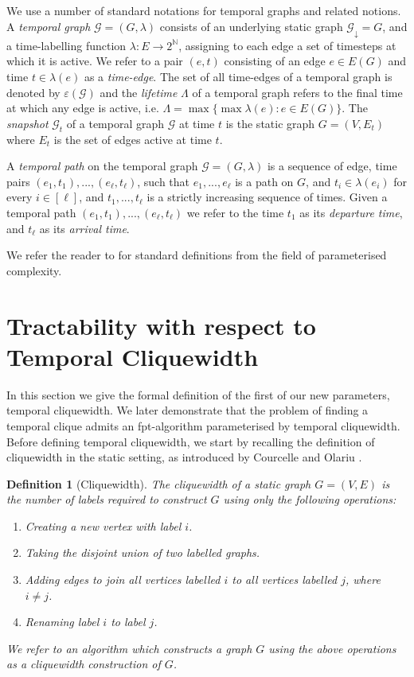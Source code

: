 \documentclass[preprint,12pt]{elsarticle}
\newtheorem{definition}{Definition}
\begin{document}
We use a number of standard notations for temporal graphs and related notions.  A \emph{temporal graph} $\mathcal{G} = (G, \lambda)$ consists of an underlying static graph $\mathcal{G}_\downarrow=G$, and a time-labelling function $\lambda : E \to 2^\mathbb{N}$, assigning to each edge a set of timesteps at which it is active. We refer to a pair $(e,t)$ consisting of an edge $e\in E(G)$ and time $t\in\lambda(e)$ as a \emph{time-edge}. The set of all time-edges of a temporal graph is denoted by $\varepsilon(\mathcal{G})$ and the \emph{lifetime} $\Lambda$ of a temporal graph refers to the final time at which any edge is active, i.e.  $\Lambda = \max \{ \max \lambda(e) : e \in  E(G)\}$. The \emph{snapshot} $\mathcal{G}_t$ of a temporal graph $\mathcal{G}$ at time $t$ is the static graph $G=(V,E_t)$ where $E_t$ is the set of edges active at time $t$.


A \emph{temporal path} on the temporal graph $\mathcal{G}=(G, \lambda)$ is a sequence of edge, time pairs $(e_1,t_1),...,(e_\ell,t_\ell)$, such that $e_1,...,e_\ell$ is a path on $G$, and $t_i\in \lambda(e_i)$ for every $i\in[\ell]$, and $t_1,...,t_\ell$ is a strictly increasing sequence of times.  Given a temporal path $(e_1,t_1),...,(e_\ell,t_\ell)$ we refer to the time $t_1$ as its \emph{departure time}, and $t_\ell$ as its \emph{arrival time}.

We refer the reader to \cite{cygan_parameterized_2015} for standard definitions from the field of parameterised complexity.

\section{Tractability with respect to Temporal Cliquewidth}\label{sec:TCW}

In this section we give the formal definition of the first of our new parameters, temporal cliquewidth. We later demonstrate that the problem of finding a temporal clique admits an fpt-algorithm parameterised by temporal cliquewidth.  Before defining temporal cliquewidth, we start by recalling the definition of cliquewidth in the static setting, as introduced by Courcelle and Olariu \cite{courcelle_upper_2000}. 

\begin{definition}[Cliquewidth]\label{def:cw}
The \emph{cliquewidth} of a static graph $G=(V,E)$ is the number of labels required to construct $G$ using only the following operations:
    \begin{enumerate}
    \item Creating a new vertex with label $i$.
    \item Taking the disjoint union of two labelled graphs.
    \item Adding edges to join all vertices labelled $i$ to all vertices labelled $j$, where $i \neq j$.
    \item Renaming label $i$ to label $j$.
\end{enumerate}
We refer to an algorithm which constructs a graph $G$ using the above operations as a \emph{cliquewidth construction} of $G$.
\end{definition}
\end{document}
